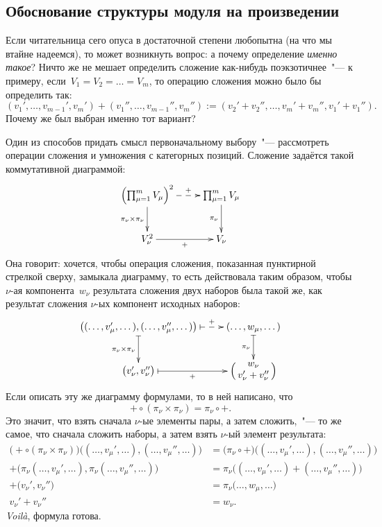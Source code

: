 \subsection{Обоснование структуры модуля на произведении}
\label{sec:module_structure_on_production}

Если читательница сего опуса в достаточной степени любопытна (на что мы втайне надеемся), то может возникнуть вопрос: а почему определение \emph{именно такое}? Ничто же не мешает определить сложение как-нибудь поэкзотичнее~"--- к примеру, если~$V_1 = V_2 = \dots = V_m$, то операцию сложения можно было бы определить так:
\[
	(v_1', \dots, v_{m-1}', v_m') +
	(v_1'', \dots, v_{m-1}'', v_m'') :=
	(v_2' + v_2'', \dots, v_m' + v_m'', v_1' + v_1'')
	.
\]
Почему же был выбран именно тот вариант?

Один из способов придать смысл первоначальному выбору~"--- рассмотреть операции сложения и умножения с категорных позиций. Сложение задаётся такой коммутативной диаграммой:
\[
	\xymatrix{
		\left(
			\prod_{\mu = 1}^m V_\mu
		\right)^2
		\ar @{-->} [r] ^-{+}
		\ar [d] _-{\pi_\nu \times \pi_\nu}
		&
		\prod_{\mu = 1}^m V_\mu
		\ar [d] _-{\pi_\nu}
		\\
		V_\nu^2
		\ar [r] _-{+}
		&
		V_\nu
	}
\]
Она говорит: хочется, чтобы операция сложения, показанная пунктирной стрелкой сверху, замыкала диаграмму, то есть действовала таким образом, чтобы $\nu$-ая компонента~$w_\nu$ результата сложения двух наборов была такой же, как результат сложения $\nu$-ых компонент исходных наборов:
\[
	\xymatrix{
		\bigl(
			(\dots, v_\mu', \dots),
			(\dots, v_\mu'', \dots)
		\bigr)
		\ar @{|-->} [r] ^-{+}
		\ar @{|->} [d] _-{\pi_\nu \times \pi_\nu}
		&
		(\dots, w_\mu, \dots)
		\ar @{|->} [d] _-{\pi_\nu}
		\\
		\bigl(
			v_\nu',
			v_\nu''
		\bigr)
		\ar @{|->} [r] _-{+}
		&
		\left(
			\parbox{0.5in}{%
				\centering
				$w_\nu$\\
				$v_\nu' + v_\nu''$
			}%
		\right)
	}
\]
Если описать эту же диаграмму формулами, то в ней написано, что
\[ {+} \circ(\pi_\nu \times \pi_\nu) = \pi_\nu \circ {+} . \]
Это значит, что взять сначала $\nu$-ые элементы пары, а затем сложить,~"--- то же самое, что сначала сложить наборы, а затем взять $\nu$-ый элемент результата:
\begin{align*}
	\bigl(
		+ \circ
		(\pi_\nu \times \pi_\nu)
	\bigr)
	\bigl(
		(\dots, v_\mu', \dots),
		(\dots, v_\mu'', \dots)
	\bigr)
	&=
	\bigl(
		\pi_\nu
		\circ
		+
	\bigr)
	\bigl(
		(\dots, v_\mu', \dots),
		(\dots, v_\mu'', \dots)
	\bigr)
	\\
	+
	\bigl(
		\pi_\nu(\dots, v_\mu', \dots),
		\pi_\nu(\dots, v_\mu'', \dots)
	\bigr)
	&=
	\pi_\nu
	\bigl(
		(\dots, v_\mu', \dots)
		+
		(\dots, v_\mu'', \dots)
	\bigr)
	\\
	+
	\bigl(
		v_\nu',
		v_\nu''
	\bigr)
	&=
	\pi_\nu
	\bigl(
		\dots, w_\mu, \dots
	\bigr)
	\\
	v_\nu'
	+
	v_\nu''
	&=
	w_\nu
	.
\end{align*}
\emph{Voil\`{a}}, формула готова.

